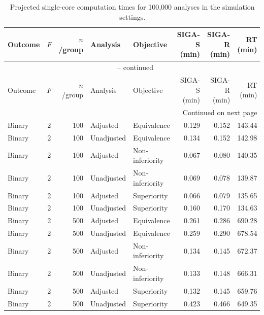 \documentclass[12pt,a4paper]{article}
\theoremstyle{definition}
\theoremstyle{remark}\newtheorem{remark}{Remark}
\numberwithin{equation}{section}
\begin{document}
\clearpage
\begin{singlespace}
\begingroup
\small
\setlength{\tabcolsep}{3.2pt}
\renewcommand{\arraystretch}{1.06}
\setlength{\LTleft}{\fill}
\setlength{\LTright}{\fill}

\begin{longtable}{@{}lcrllrrr@{}}
\caption{Projected single-core computation times for 100,000 analyses in the simulation settings.}
\label{tab:supp-computation-times}\\
\toprule
Outcome & $F$ & $n$/group & Analysis & Objective & SIGA-S (min) & SIGA-R (min) & RT (min) \\
\midrule
\endfirsthead

\multicolumn{8}{c}{\tablename\ \thetable{} -- continued}\\
\toprule
Outcome & $F$ & $n$/group & Analysis & Objective & SIGA-S (min) & SIGA-R (min) & RT (min) \\
\midrule
\endhead

\midrule
\multicolumn{8}{r}{Continued on next page}\\
\endfoot

\bottomrule
\endlastfoot

Binary & 2 & 100 & Adjusted & Equivalence & 0.129 & 0.152 & 143.44 \\
Binary & 2 & 100 & Unadjusted & Equivalence & 0.134 & 0.152 & 142.98 \\
Binary & 2 & 100 & Adjusted & Non-inferiority & 0.067 & 0.080 & 140.35 \\
Binary & 2 & 100 & Unadjusted & Non-inferiority & 0.069 & 0.078 & 139.87 \\
Binary & 2 & 100 & Adjusted & Superiority & 0.066 & 0.079 & 135.65 \\
Binary & 2 & 100 & Unadjusted & Superiority & 0.160 & 0.170 & 134.63 \\

Binary & 2 & 500 & Adjusted & Equivalence & 0.261 & 0.286 & 690.28 \\
Binary & 2 & 500 & Unadjusted & Equivalence & 0.259 & 0.290 & 678.54 \\
Binary & 2 & 500 & Adjusted & Non-inferiority & 0.134 & 0.145 & 672.37 \\
Binary & 2 & 500 & Unadjusted & Non-inferiority & 0.133 & 0.148 & 666.31 \\
Binary & 2 & 500 & Adjusted & Superiority & 0.132 & 0.145 & 659.76 \\
Binary & 2 & 500 & Unadjusted & Superiority & 0.423 & 0.466 & 649.35 \\


\end{longtable}
\end{singlespace}
\end{document}
